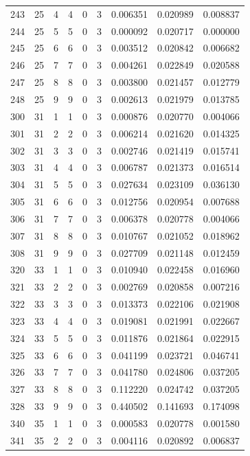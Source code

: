 \begin{longtable}{rrrrrrrrr}
243 & 25 & 4 & 4 & 0 & 3 & 0.006351 & 0.020989 & 0.008837 \\
244 & 25 & 5 & 5 & 0 & 3 & 0.000092 & 0.020717 & 0.000000 \\
245 & 25 & 6 & 6 & 0 & 3 & 0.003512 & 0.020842 & 0.006682 \\
246 & 25 & 7 & 7 & 0 & 3 & 0.004261 & 0.022849 & 0.020588 \\
247 & 25 & 8 & 8 & 0 & 3 & 0.003800 & 0.021457 & 0.012779 \\
248 & 25 & 9 & 9 & 0 & 3 & 0.002613 & 0.021979 & 0.013785 \\
300 & 31 & 1 & 1 & 0 & 3 & 0.000876 & 0.020770 & 0.004066 \\
301 & 31 & 2 & 2 & 0 & 3 & 0.006214 & 0.021620 & 0.014325 \\
302 & 31 & 3 & 3 & 0 & 3 & 0.002746 & 0.021419 & 0.015741 \\
303 & 31 & 4 & 4 & 0 & 3 & 0.006787 & 0.021373 & 0.016514 \\
304 & 31 & 5 & 5 & 0 & 3 & 0.027634 & 0.023109 & 0.036130 \\
305 & 31 & 6 & 6 & 0 & 3 & 0.012756 & 0.020954 & 0.007688 \\
306 & 31 & 7 & 7 & 0 & 3 & 0.006378 & 0.020778 & 0.004066 \\
307 & 31 & 8 & 8 & 0 & 3 & 0.010767 & 0.021052 & 0.018962 \\
308 & 31 & 9 & 9 & 0 & 3 & 0.027709 & 0.021148 & 0.012459 \\
320 & 33 & 1 & 1 & 0 & 3 & 0.010940 & 0.022458 & 0.016960 \\
321 & 33 & 2 & 2 & 0 & 3 & 0.002769 & 0.020858 & 0.007216 \\
322 & 33 & 3 & 3 & 0 & 3 & 0.013373 & 0.022106 & 0.021908 \\
323 & 33 & 4 & 4 & 0 & 3 & 0.019081 & 0.021991 & 0.022667 \\
324 & 33 & 5 & 5 & 0 & 3 & 0.011876 & 0.021864 & 0.022915 \\
325 & 33 & 6 & 6 & 0 & 3 & 0.041199 & 0.023721 & 0.046741 \\
326 & 33 & 7 & 7 & 0 & 3 & 0.041780 & 0.024806 & 0.037205 \\
327 & 33 & 8 & 8 & 0 & 3 & 0.112220 & 0.024742 & 0.037205 \\
328 & 33 & 9 & 9 & 0 & 3 & 0.440502 & 0.141693 & 0.174098 \\
340 & 35 & 1 & 1 & 0 & 3 & 0.000583 & 0.020778 & 0.001580 \\
341 & 35 & 2 & 2 & 0 & 3 & 0.004116 & 0.020892 & 0.006837 \\

\end{longtable}

